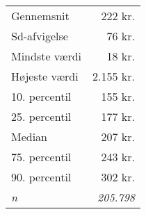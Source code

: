 \begin{tabular}{lr}
\toprule
Gennemsnit &                    222 kr.  \\
Sd-afvigelse &                      76 kr.  \\
\midrule
Mindste værdi &                      18 kr.  \\
Højeste værdi &                 2.155 kr.  \\
\midrule
10. percentil &                    155 kr.  \\
25. percentil &                    177 kr.  \\
Median &                    207 kr.  \\
75. percentil &                    243 kr.  \\
90. percentil &                    302 kr.  \\
\midrule
\textit{n} & \textit{205.798} \\
\bottomrule
\end{tabular}%
